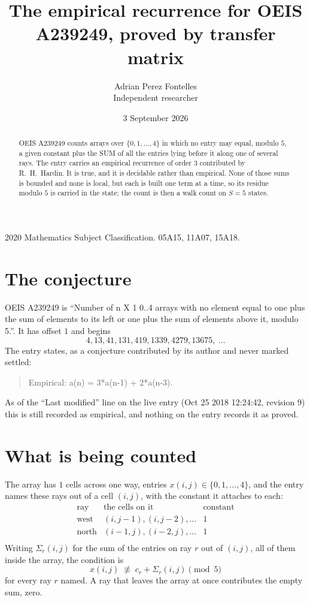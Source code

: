 \documentclass[11pt,a4paper]{article}
\title{The empirical recurrence for OEIS A239249, proved by transfer matrix}
\author{Adrian Perez Fontelles\\ \small Independent researcher}
\date{3 September 2026}
\theoremstyle{plain}
\theoremstyle{definition}
\begin{document}
\maketitle

\begin{abstract}
OEIS A239249 counts arrays over $\{0,1,\dots,4\}$ in which no entry may equal, modulo $5$, a given
constant plus the SUM of all the entries lying before it along one of several rays. The entry
carries an empirical recurrence of order $3$ contributed by R.~H.~Hardin. It is true, and
it is decidable rather than empirical. None of those sums is bounded and none is local, but
each is built one term at a time, so its residue modulo $5$ is carried in the state; the
count is then a walk count on $S=5$ states.
\end{abstract}

\noindent\small 2020 Mathematics Subject Classification. 05A15, 11A07, 15A18.\normalsize

\section{The conjecture}

OEIS A239249 is ``Number of n X 1 0..4 arrays with no element equal to one plus the sum of elements to its left or one plus the sum of elements above it, modulo 5.''. It has offset $1$ and begins
\[
4, 13, 41, 131, 419, 1339, 4279, 13675,\ \dots
\]
The entry states, as a conjecture contributed by its author and never marked settled:
\begin{quote}
Empirical: a(n) = 3*a(n-1) + 2*a(n-3).
\end{quote}
As of the ``Last modified'' line on the live entry (Oct 25 2018 12:24:42, revision 9) this is still
recorded as empirical, and nothing on the entry records it as proved.

\section{What is being counted}

The array has $1$ cells across one way, entries $x(i,j)\in\{0,1,\dots,4\}$, and the entry names these
rays out of a cell $(i,j)$, with the constant it attaches to each:
\[
\begin{array}{lll}
\text{ray} & \text{the cells on it} & \text{constant} \\[2pt]
\text{west} & (i,j-1),(i,j-2),\dots & 1 \\
\text{north} & (i-1,j),(i-2,j),\dots & 1 \\
\end{array}
\]
Writing $\Sigma_r(i,j)$ for the sum of the entries on ray $r$ out of $(i,j)$, all of them
inside the array, the condition is
\[
x(i,j)\;\not\equiv\;c_r+\Sigma_r(i,j) \pmod{5}
\]
for every ray $r$ named. A ray that leaves the array at once contributes the empty sum,
zero.
\end{document}
